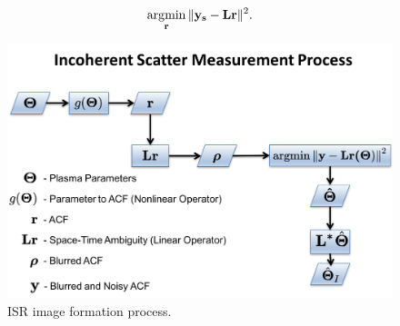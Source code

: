 \begin{equation}
\label{eqn:lstsqrs:disc}
\operatorname*{\arg\!\min}\limits_{\mathbf{r}} \| \mathbf{y_s} -\mathbf{ L}\mathbf{r} \|^2.
\end{equation}

\begin{figure}[!ht]
\centering
\includegraphics[width=.8\textwidth]{ladj}
\caption{\label{fig:flow1}ISR image formation process.}
\end{figure}





